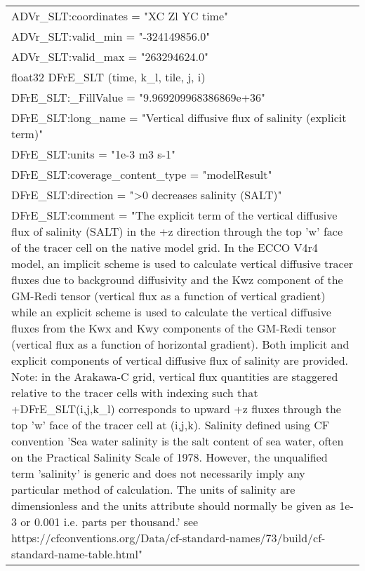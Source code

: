 \begin{longtable}{|p{\textwidth}|}
\hspace{0.5cm}\hspace{0.5cm}ADVr\_SLT:coordinates = "XC Zl YC time"\\
\hspace{0.5cm}\hspace{0.5cm}ADVr\_SLT:valid\_min = "-324149856.0"\\
\hspace{0.5cm}\hspace{0.5cm}ADVr\_SLT:valid\_max = "263294624.0"\\
\hspace{0.5cm}float32 DFrE\_SLT (time, k\_l, tile, j, i)\\
\hspace{0.5cm}\hspace{0.5cm}DFrE\_SLT:\_FillValue = "9.969209968386869e+36"\\
\hspace{0.5cm}\hspace{0.5cm}DFrE\_SLT:long\_name = "Vertical diffusive flux of salinity (explicit term)"\\
\hspace{0.5cm}\hspace{0.5cm}DFrE\_SLT:units = "1e-3 m3 s-1"\\
\hspace{0.5cm}\hspace{0.5cm}DFrE\_SLT:coverage\_content\_type = "modelResult"\\
\hspace{0.5cm}\hspace{0.5cm}DFrE\_SLT:direction = ">0 decreases salinity (SALT)"\\
\hspace{0.5cm}\hspace{0.5cm}DFrE\_SLT:comment = "The explicit term of the vertical diffusive flux of salinity (SALT) in the +z direction through the top 'w' face of the tracer cell on the native model grid. In the ECCO V4r4 model, an implicit scheme is used to calculate vertical diffusive tracer fluxes due to background diffusivity and the Kwz component of the GM-Redi tensor (vertical flux as a function of vertical gradient) while an explicit scheme is used to calculate the vertical diffusive fluxes from the Kwx and Kwy components of the GM-Redi tensor (vertical flux as a function of horizontal gradient). Both implicit and explicit components of vertical diffusive flux of salinity are provided. Note: in the Arakawa-C grid, vertical flux quantities are staggered relative to the tracer cells with indexing such that +DFrE\_SLT(i,j,k\_l) corresponds to upward +z fluxes through the top 'w' face of the tracer cell at (i,j,k). Salinity defined using CF convention 'Sea water salinity is the salt content of sea water, often on the Practical Salinity Scale of 1978. However, the unqualified term 'salinity' is generic and does not necessarily imply any particular method of calculation. The units of salinity are dimensionless and the units attribute should normally be given as 1e-3 or 0.001 i.e. parts per thousand.' see https://cfconventions.org/Data/cf-standard-names/73/build/cf-standard-name-table.html"\\

\end{longtable}
